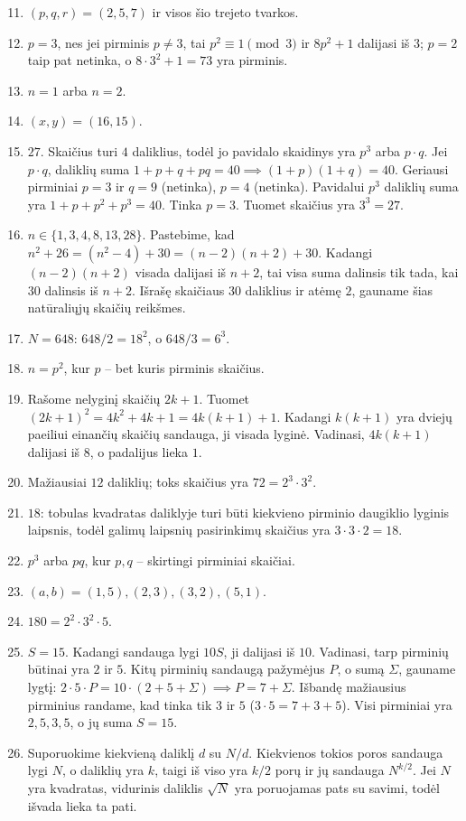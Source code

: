 \documentclass[11pt,a4paper]{scrartcl}
\begin{document}
\begin{enumerate}
    \setcounter{enumi}{10}
    \item \((p,q,r)=(2,5,7)\) ir visos šio trejeto tvarkos.
    \item \(p=3\), nes jei pirminis \(p\ne3\), tai \(p^2\equiv1\pmod3\) ir \(8p^2+1\) dalijasi iš $3$; \(p=2\) taip pat netinka, o \(8\cdot3^2+1=73\) yra pirminis.
    \item \(n=1\) arba \(n=2\).
    \item \((x,y)=(16,15)\).
    \item $27$. Skaičius turi $4$ daliklius, todėl jo pavidalo skaidinys yra \(p^3\) arba \(p \cdot q\). Jei \(p \cdot q\), daliklių suma \(1+p+q+pq = 40 \implies (1+p)(1+q)=40\). Geriausi pirminiai \(p=3\) ir \(q=9\) (netinka), \(p=4\) (netinka). Pavidalui \(p^3\) daliklių suma yra \(1+p+p^2+p^3=40\). Tinka \(p=3\). Tuomet skaičius yra \(3^3=27\).
    \item \(n \in \{1, 3, 4, 8, 13, 28\}\). Pastebime, kad \(n^2+26 = (n^2-4) + 30 = (n-2)(n+2) + 30\). Kadangi \((n-2)(n+2)\) visada dalijasi iš \(n+2\), tai visa suma dalinsis tik tada, kai $30$ dalinsis iš \(n+2\). Išrašę skaičiaus $30$ daliklius ir atėmę $2$, gauname šias natūraliųjų skaičių reikšmes.
    \item \(N=648\): \(648/2=18^2\), o \(648/3=6^3\).
    \item \(n=p^2\), kur \(p\) – bet kuris pirminis skaičius.
    \item Rašome nelyginį skaičių \(2k+1\). Tuomet \((2k+1)^2 = 4k^2+4k+1 = 4k(k+1)+1\). Kadangi \(k(k+1)\) yra dviejų paeiliui einančių skaičių sandauga, ji visada lyginė. Vadinasi, \(4k(k+1)\) dalijasi iš $8$, o padalijus lieka $1$.
    \item Mažiausiai $12$ daliklių; toks skaičius yra \(72=2^3\cdot3^2\).
\end{enumerate}

\begin{enumerate}
    \setcounter{enumi}{20}
    \item $18$: tobulas kvadratas daliklyje turi būti kiekvieno pirminio daugiklio lyginis laipsnis, todėl galimų laipsnių pasirinkimų skaičius yra \(3\cdot3\cdot2=18\).
    \item \(p^3\) arba \(pq\), kur \(p,q\) – skirtingi pirminiai skaičiai.
    \item \((a,b)=(1,5),(2,3),(3,2),(5,1)\).
    \item \(180=2^2\cdot3^2\cdot5\).
    \item \(S=15\). Kadangi sandauga lygi $10S$, ji dalijasi iš $10$. Vadinasi, tarp pirminių būtinai yra $2$ ir $5$. Kitų pirminių sandaugą pažymėjus \(P\), o sumą \(\Sigma\), gauname lygtį: \(2 \cdot 5 \cdot P = 10 \cdot (2 + 5 + \Sigma) \implies P = 7 + \Sigma\). Išbandę mažiausius pirminius randame, kad tinka tik $3$ ir $5$ (\(3 \cdot 5 = 7 + 3 + 5\)). Visi pirminiai yra $2, 5, 3, 5$, o jų suma \(S = 15\).
    \item Suporuokime kiekvieną daliklį \(d\) su \(N/d\). Kiekvienos tokios poros sandauga lygi \(N\), o daliklių yra \(k\), taigi iš viso yra \(k/2\) porų ir jų sandauga \(N^{k/2}\). Jei \(N\) yra kvadratas, vidurinis daliklis \(\sqrt N\) yra poruojamas pats su savimi, todėl išvada lieka ta pati.
\end{enumerate}
\end{document}
